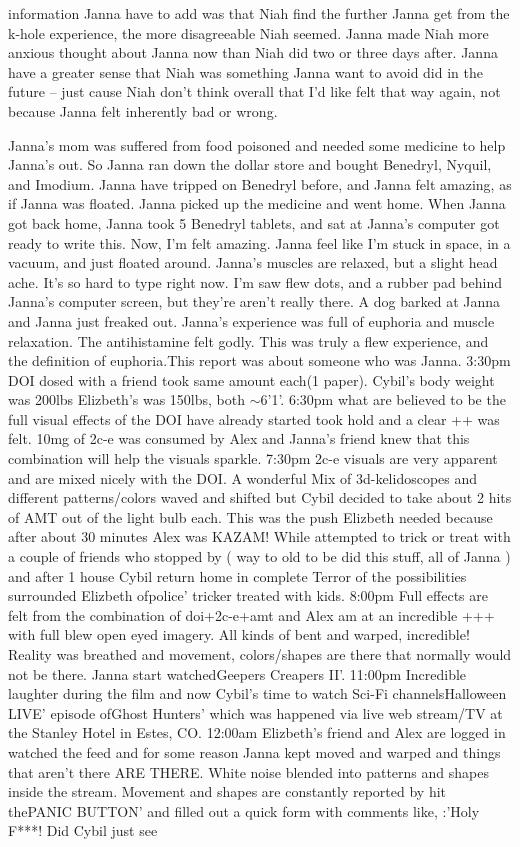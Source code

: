 \documentclass[12pt]{book}
\begin{document}
information Janna have to add was that Niah find the further Janna get from the k-hole experience, the more disagreeable Niah seemed. Janna made Niah more anxious thought about Janna now than Niah did two or three days after. Janna have a greater sense that Niah was something Janna want to avoid did in the future -- just cause Niah don't think overall that I'd like felt that way again, not because Janna felt inherently bad or wrong.



Janna's mom was suffered from food poisoned and needed some medicine to help Janna's out. So Janna ran down the dollar store and bought Benedryl, Nyquil, and Imodium. Janna have tripped on Benedryl before, and Janna felt amazing, as if Janna was floated. Janna picked up the medicine and went home. When Janna got back home, Janna took 5 Benedryl tablets, and sat at Janna's computer got ready to write this. Now, I'm felt amazing. Janna feel like I'm stuck in space, in a vacuum, and just floated around. Janna's muscles are relaxed, but a slight head ache. It's so hard to type right now. I'm saw flew dots, and a rubber pad behind Janna's computer screen, but they're aren't really there. A dog barked at Janna and Janna just freaked out. Janna's experience was full of euphoria and muscle relaxation. The antihistamine felt godly. This was truly a flew experience, and the definition of euphoria.This report was about someone who was Janna. 3:30pm DOI dosed with a friend took same amount each(1 paper). Cybil's body weight was 200lbs Elizbeth's was 150lbs, both $\sim$6'1'. 6:30pm what are believed to be the full visual effects of the DOI have already started took hold and a clear ++ was felt. 10mg of 2c-e was consumed by Alex and Janna's friend knew that this combination will help the visuals sparkle. 7:30pm 2c-e visuals are very apparent and are mixed nicely with the DOI. A wonderful Mix of 3d-kelidoscopes and different patterns/colors waved and shifted but Cybil decided to take about 2 hits of AMT out of the light bulb each. This was the push Elizbeth needed because after about 30 minutes Alex was KAZAM! While attempted to trick or treat with a couple of friends who stopped by ( way to old to be did this stuff, all of Janna ) and after 1 house Cybil return home in complete Terror of the possibilities surrounded Elizbeth ofpolice' tricker treated with kids. 8:00pm Full effects are felt from the combination of doi+2c-e+amt and Alex am at an incredible +++ with full blew open eyed imagery. All kinds of bent and warped, incredible! Reality was breathed and movement, colors/shapes are there that normally would not be there. Janna start watchedGeepers Creapers II'. 11:00pm Incredible laughter during the film and now Cybil's time to watch Sci-Fi channelsHalloween LIVE' episode ofGhost Hunters' which was happened via live web stream/TV at the Stanley Hotel in Estes, CO. 12:00am Elizbeth's friend and Alex are logged in watched the feed and for some reason Janna kept moved and warped and things that aren't there ARE THERE. White noise blended into patterns and shapes inside the stream. Movement and shapes are constantly reported by hit thePANIC BUTTON' and filled out a quick form with comments like, :'Holy F***! Did Cybil just see 
\end{document}

